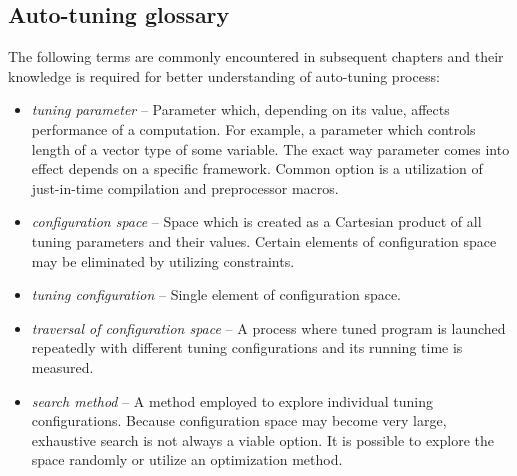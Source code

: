\documentclass[
  digital,     %
  oneside,     %
  nosansbold,  %
  nocolorbold, %
  lof,         %
  lot,         %
  nocover
]{fithesis4}
\begin{document}
\subsection{Auto-tuning glossary}
The following terms are commonly encountered in subsequent chapters and their knowledge is required for better understanding of auto-tuning process:
\begin{itemize}
	\item \textit{tuning parameter} -- Parameter which, depending on its value, affects performance of a computation. For example, a parameter which controls length of a vector type of some variable. The exact way parameter comes into effect depends on a specific framework. Common option is a utilization of just-in-time compilation and preprocessor macros.
	\item \textit{configuration space} -- Space which is created as a Cartesian product of all tuning parameters and their values. Certain elements of configuration space may be eliminated by utilizing constraints.
	\item \textit{tuning configuration} -- Single element of configuration space.
	\item \textit{traversal of configuration space} -- A process where tuned program is launched repeatedly with different tuning configurations and its running time is measured.
	\item \textit{search method} -- A method employed to explore individual tuning configurations. Because configuration space may become very large,	exhaustive search is not always a viable option. It is possible to explore the space randomly or utilize an optimization method.
\end{itemize}
\end{document}

